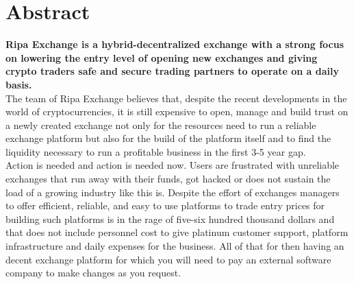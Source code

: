 \documentclass[11pt,fleqn,oneside]{book} %
\begin{document}

\begingroup
\thispagestyle{empty}
\endgroup

\newpage

\usechapterimagefalse %
\chapter{Abstract}
\textbf{Ripa Exchange is a hybrid-decentralized exchange with a strong focus on lowering the entry level
of opening new exchanges and giving crypto traders safe and secure trading partners to operate on a daily basis.}\\

The team of Ripa Exchange believes that, despite the recent developments in the world of
cryptocurrencies, it is still expensive to open, manage and build trust on a newly created exchange not
only for the resources need to run a reliable exchange platform but also for the build of the platform 
itself and to find the liquidity necessary to run a profitable business in the first 3-5 year gap.\\

Action is needed and action is needed now. Users are frustrated with unreliable exchanges that run away
with their funds, got hacked or does not sustain the load of a growing industry like this is. Despite
the effort of exchanges managers to offer efficient, reliable, and easy to use platforms to trade entry
prices for building such platforms is in the rage of five-six hundred thousand dollars and that does not 
include personnel cost to give platinum customer support, platform infrastructure and daily expenses for
the business. All of that for then having an decent exchange platform for which you will need to pay an 
external software company to make changes as you request.\\
\end{document}
